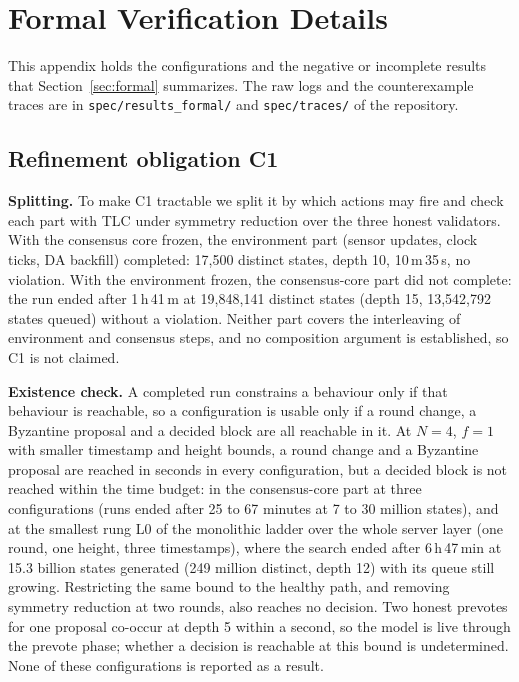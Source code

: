 \section{Formal Verification Details}
\label{app:formal}

This appendix holds the configurations and the negative or incomplete results that
Section~\ref{sec:formal} summarizes. The raw logs and the counterexample traces are
in \texttt{spec/results\_formal/} and \texttt{spec/traces/} of the repository.

\subsection*{Refinement obligation C1}

\textbf{Splitting.} To make C1 tractable we split it by which actions may
fire and check each part with TLC under symmetry reduction over the three honest
validators. With the consensus core frozen, the environment part (sensor updates,
clock ticks, DA backfill) completed: 17{,}500 distinct states, depth 10,
10\,m\,35\,s, no violation. With the environment frozen, the consensus-core part
did not complete: the run ended after 1\,h\,41\,m at 19{,}848{,}141 distinct
states (depth 15, 13{,}542{,}792 states queued) without a violation. Neither
part covers the interleaving of environment and consensus steps, and no
composition argument is established, so C1 is not claimed.

\textbf{Existence check.} A completed run constrains a behaviour only if that
behaviour is reachable, so a configuration is usable only if a round change, a
Byzantine proposal and a decided block are all reachable in it. At $N{=}4$, $f{=}1$
with smaller timestamp and height bounds, a round change and a Byzantine proposal
are reached in seconds in every configuration, but a decided block is not reached
within the time budget: in the consensus-core part at three configurations (runs
ended after 25 to 67 minutes at 7 to 30 million states), and at the smallest rung L0
of the monolithic ladder over the whole server layer (one round, one height, three
timestamps), where the search ended after 6\,h\,47\,min at 15.3 billion states
generated (249 million distinct, depth 12) with its queue still growing.
Restricting the same bound to the healthy path, and removing symmetry reduction at
two rounds, also reaches no decision. Two honest prevotes for one proposal co-occur
at depth 5 within a second, so the model is live through the prevote phase; whether
a decision is reachable at this bound is undetermined. None of these configurations
is reported as a result.

